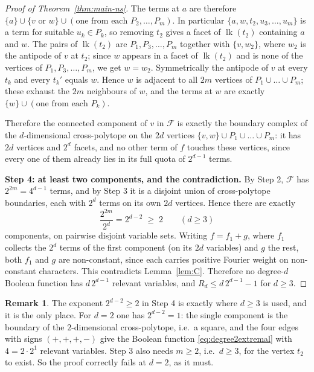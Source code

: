 \documentclass[11pt,reqno]{amsart}
\theoremstyle{plain}
\theoremstyle{definition}
\newtheorem{remark}[theorem]{Remark}
\numberwithin{theorem}{section}
\newcommand{\lk}{\operatorname{lk}}
\begin{document}
\begin{proof}[Proof of Theorem~\ref{thm:main-ns}]
The terms at $a$ are therefore $\{a\} \cup \{v \text{ or } w\} \cup
(\text{one from each } P_2, \dots, P_m)$. In particular
$\{a, w, t_2, u_3, \dots, u_m\}$ is a term for suitable $u_k \in P_k$, so removing $t_2$ gives a
facet of $\lk(t_2)$ containing $a$ and $w$. The pairs of $\lk(t_2)$ are
$P_1, P_3, \dots, P_m$ together with $\{v, w_2\}$, where $w_2$ is the antipode of $v$ at $t_2$;
since $w$ appears in a facet of $\lk(t_2)$ and is none of the vertices of
$P_1, P_3, \dots, P_m$, we get $w = w_2$. Symmetrically the antipode of $v$ at every $t_k$ and
every $t_k'$ equals $w$. Hence $w$ is adjacent to all $2m$ vertices of
$P_1 \cup \dots \cup P_m$; these exhaust the $2m$ neighbours of $w$, and the terms at $w$ are
exactly $\{w\} \cup (\text{one from each } P_k)$.

Therefore the connected component of $v$ in $\mathcal{F}$ is exactly the boundary complex of the
$d$-dimensional cross-polytope on the $2d$ vertices $\{v, w\} \cup P_1 \cup \dots \cup P_m$:
it has $2d$ vertices and $2^d$ facets, and no other term of $f$ touches these vertices, since
every one of them already lies in its full quota of $2^{d-1}$ terms.

\smallskip\noindent\textbf{Step 4: at least two components, and the contradiction.}
By Step 2, $\mathcal{F}$ has $2^{2m} = 4^{d-1}$ terms, and by Step 3 it is a disjoint union of
cross-polytope boundaries, each with $2^d$ terms on its own $2d$ vertices. Hence there are
exactly
\[
  \frac{2^{2m}}{2^{d}} = 2^{d-2} \;\ge\; 2 \qquad (d \ge 3)
\]
components, on pairwise disjoint variable sets. Writing $f = f_1 + g$, where $f_1$ collects the
$2^d$ terms of the first component (on its $2d$ variables) and $g$ the rest, both $f_1$ and $g$
are non-constant, since each carries positive Fourier weight on non-constant characters. This
contradicts Lemma~\ref{lem:C}. Therefore no degree-$d$ Boolean function has $d\,2^{d-1}$
relevant variables, and $R_d \le d\,2^{d-1} - 1$ for $d \ge 3$.
\end{proof}

\begin{remark}
The exponent $2^{d-2} \ge 2$ in Step 4 is exactly where $d \ge 3$ is used, and it is the only
place. For $d = 2$ one has $2^{d-2} = 1$: the single component is the boundary of the
$2$-dimensional cross-polytope, i.e.\ a square, and the four edges with signs $(+,+,+,-)$ give
the Boolean function \eqref{eq:degree2extremal} with $4 = 2 \cdot 2^1$ relevant variables.
Step 3 also needs $m \ge 2$, i.e.\ $d \ge 3$, for the vertex $t_2$ to exist. So the proof
correctly fails at $d = 2$, as it must.
\end{remark}
\end{document}
